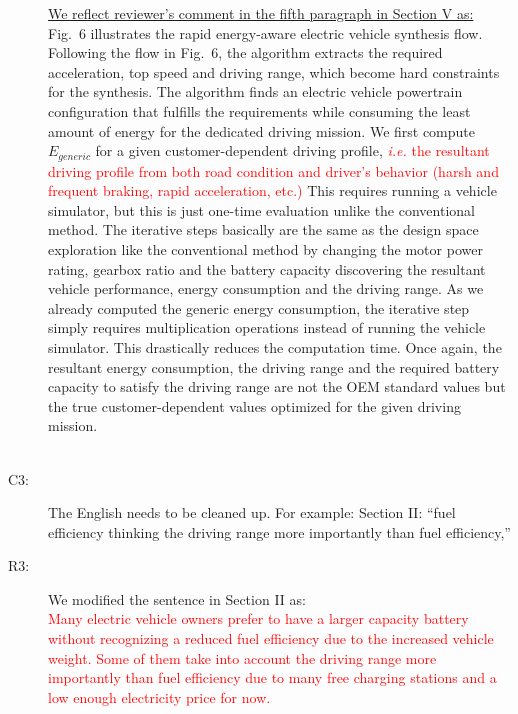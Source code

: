 \documentclass[onecolumn]{IEEEconf}
\begin{document}
\begin{description}
\underline{We reflect reviewer’s comment in the fifth paragraph in Section V as:}\\
Fig.~6 illustrates the rapid energy-aware electric vehicle synthesis flow. 
Following the flow in Fig.~6, the algorithm extracts the required acceleration, top speed and driving range, which become hard constraints for the synthesis. The algorithm finds an electric vehicle powertrain configuration that fulfills the requirements while consuming the least amount of energy for the dedicated driving mission. 
We first compute $E_{generic}$ for a given customer-dependent driving profile, \textcolor{red}{\textit{i.e.} the resultant driving profile from both road condition and driver's behavior (harsh and frequent braking, rapid acceleration, etc.)} This requires running a vehicle simulator, but this is just one-time evaluation unlike the conventional method. The iterative steps basically are the same as the design space exploration like the conventional method by changing the motor power rating, gearbox ratio and the battery capacity discovering the resultant vehicle performance, energy consumption and the driving range. As we already computed the generic energy consumption, the iterative step simply requires multiplication operations instead of running the vehicle simulator. This drastically reduces the computation time. Once again, the resultant energy consumption, the driving range and the required battery capacity to satisfy the driving range are not the OEM standard values but the true customer-dependent values optimized for the given driving mission.\\ 
~\\

\item [C3: ]  The English needs to be cleaned up. For example: Section II: “fuel efficiency thinking the driving range more importantly than fuel efficiency,”
\item [R3: ] We modified the sentence in Section II as:\\

\textcolor{red}{Many electric vehicle owners prefer to have a larger capacity battery without recognizing a reduced fuel efficiency due to the increased vehicle weight. Some of them take into account the driving range more importantly than fuel efficiency due to many free charging stations and a low enough electricity price for now.}\\
~\\


\end{description}
\end{document}
